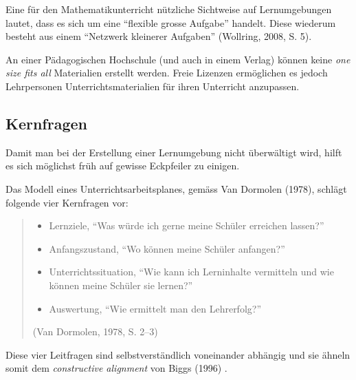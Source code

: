 \documentclass[
  10pt,
  a4paper,
  DIV=11]{scrartcl}
\providecommand{\tightlist}{%
  \setlength{\itemsep}{0pt}\setlength{\parskip}{0pt}}\usepackage{longtable,booktabs,array}
\begin{document}
Eine für den Mathematikunterricht nützliche Sichtweise auf
Lernumgebungen lautet, dass es sich um eine ``flexible grosse Aufgabe''
handelt. Diese wiederum besteht aus einem ``Netzwerk kleinerer
Aufgaben'' (Wollring, 2008, S. 5).

\begin{tcolorbox}[enhanced jigsaw, title=\textcolor{quarto-callout-tip-color}{\faLightbulb}\hspace{0.5em}{Tipp}, colbacktitle=quarto-callout-tip-color!10!white, breakable, leftrule=.75mm, arc=.35mm, toptitle=1mm, opacityback=0, coltitle=black, left=2mm, opacitybacktitle=0.6, colback=white, bottomtitle=1mm, colframe=quarto-callout-tip-color-frame, titlerule=0mm, rightrule=.15mm, bottomrule=.15mm, toprule=.15mm]

An einer Pädagogischen Hochschule (und auch in einem Verlag) können
keine \emph{one size fits all} Materialien erstellt werden. Freie
Lizenzen ermöglichen es jedoch Lehrpersonen Unterrichtsmaterialien für
ihren Unterricht anzupassen.

\end{tcolorbox}

\subsection{Kernfragen}\label{kernfragen}

Damit man bei der Erstellung einer Lernumgebung nicht überwältigt wird,
hilft es sich möglichst früh auf gewisse Eckpfeiler zu einigen.

Das Modell eines Unterrichtsarbeitsplanes, gemäss Van Dormolen (1978),
schlägt folgende vier Kernfragen vor:

\begin{quote}
\begin{itemize}
\tightlist
\item
  Lernziele, ``Was würde ich gerne meine Schüler erreichen lassen?''
\item
  Anfangszustand, ``Wo können meine Schüler anfangen?''
\item
  Unterrichtssituation, ``Wie kann ich Lerninhalte vermitteln und wie
  können meine Schüler sie lernen?''
\item
  Auswertung, ``Wie ermittelt man den Lehrerfolg?''
\end{itemize}

(Van Dormolen, 1978, S. 2--3)
\end{quote}

Diese vier Leitfragen sind selbstverständlich voneinander abhängig und
sie ähneln somit dem \emph{constructive alignment} von Biggs (1996) .
\end{document}
